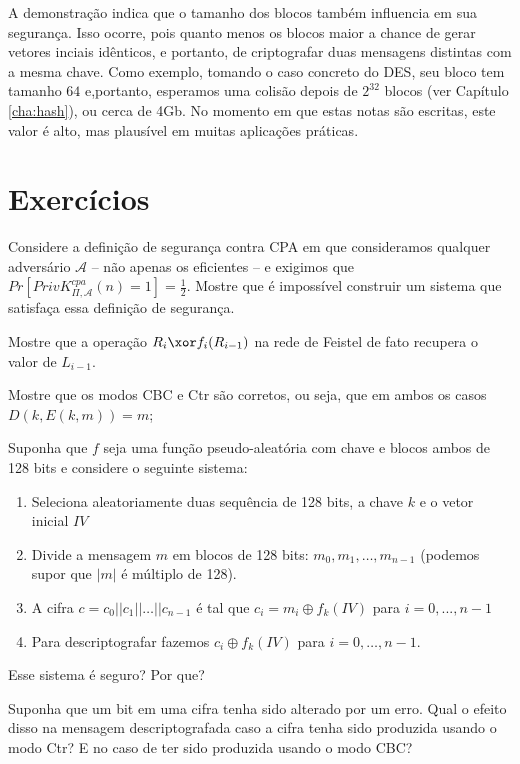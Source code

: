 A demonstração indica que o tamanho dos blocos também influencia em sua segurança.
Isso ocorre, pois quanto menos os blocos maior a chance de gerar vetores inciais idênticos, e portanto, de criptografar duas mensagens distintas com a mesma chave.
Como exemplo, tomando o caso concreto do DES, seu bloco tem tamanho $64$ e,portanto, esperamos uma colisão depois de $2^{32}$ blocos (ver Capítulo \ref{cha:hash}), ou cerca de 4Gb.
No momento em que estas notas são escritas, este valor é alto, mas plausível em muitas aplicações práticas.

\section{Exercícios}
\label{sec:exercicios}

\begin{exercicio}
  Considere a definição de segurança contra CPA em que consideramos qualquer adversário $\mathcal{A}$ -- não apenas os eficientes -- e exigimos que $Pr[PrivK^{cpa}_{\Pi,\mathcal{A}}(n) = 1] = \frac{1}{2}$.
  Mostre que é impossível construir um sistema que satisfaça essa definição de segurança.
\end{exercicio}

\begin{exercicio}
Mostre que a operação $R_i \xor f_i(R_{i-1})$ na rede de Feistel de fato recupera o valor de $L_{i-1}$.
\end{exercicio}

\begin{exercicio}
  Mostre que os modos CBC e Ctr são corretos, ou seja, que em ambos os casos $D(k, E(k,m)) = m$;
\end{exercicio}

\begin{exercicio}
  Suponha que $f$ seja uma função pseudo-aleatória com chave e blocos ambos de 128 bits e considere o seguinte sistema:
  \begin{enumerate}
  \item Seleciona aleatoriamente duas sequência de 128 bits, a chave $k$ e o vetor inicial $IV$
  \item Divide a mensagem $m$ em blocos de 128 bits: $m_0, m_1, \dots, m_{n-1}$ (podemos supor que $|m|$ é múltiplo de 128).
  \item A cifra $c = c_0 || c_1 || \dots || c_{n-1}$ é tal que $c_i = m_i \oplus f_k(IV)$ para $i = 0, ..., n-1$
  \item Para descriptografar fazemos $c_i \oplus f_k(IV)$ para $i = 0, \dots, n-1$.
  \end{enumerate}
  Esse sistema é seguro? Por que?
\end{exercicio}

\begin{exercicio}
Suponha que um bit em uma cifra tenha sido alterado por um erro.
Qual o efeito disso na mensagem descriptografada caso a cifra tenha sido produzida usando o modo Ctr? E no caso de ter sido produzida usando o modo CBC?  
\end{exercicio}



